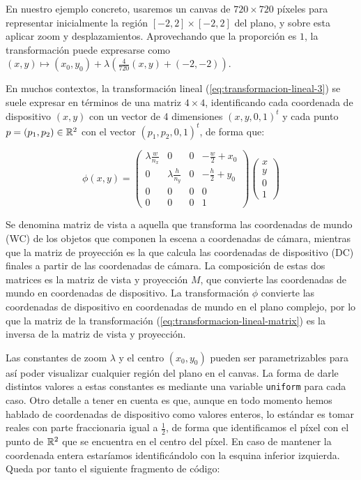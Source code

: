 En nuestro ejemplo concreto, usaremos un canvas de $720\times 720$ píxeles para representar inicialmente la región $[-2,2]\times[-2,2]$ del plano, y sobre esta aplicar zoom y desplazamientos. Aprovechando que la proporción es $1$, la transformación puede expresarse como $(x,y)\longmapsto(x_0,y_0)+\lambda\left(\frac{4}{720}(x,y) + (-2,-2)\right)$.

En muchos contextos, la transformación lineal (\ref{eq:transformacion-lineal-3}) se suele expresar en términos de una matriz $4\times 4$, identificando cada coordenada de dispositivo $(x,y)$ con un vector de 4 dimensiones $(x,y,0,1)^t$ y cada punto $p=(p_1,p_2)\in\mathbb{R}^2$ con el vector $(p_1, p_2, 0 ,1)^t$, de forma que:

\begin{equation}
    \label{eq:transformacion-lineal-matrix}
    \phi(x,y)=\left(\begin{array}{ccc|c}
        \lambda\frac{w}{n_x} & 0 & 0 & -\frac{w}{2}+x_0 \\

        0 & \lambda\frac{h}{n_y} & 0 & -\frac{h}{2}+y_0 \\
        0 & 0 & 0 & 0 \\ \hline
        0 & 0 & 0 & 1
    \end{array}\right)\left(
    \begin{array}{c}
        x \\ y \\ 0 \\ \hline 1
    \end{array}\right)
\end{equation}

Se denomina matriz de vista a aquella que transforma las coordenadas de mundo (WC) de los objetos que componen la escena a coordenadas de cámara, mientras que la matriz de proyección es la que calcula las coordenadas de dispositivo (DC) finales a partir de las coordenadas de cámara. La composición de estas dos matrices es la matriz de vista y proyección $M$, que convierte las coordenadas de mundo en coordenadas de dispositivo. La transformación $\phi$ convierte las coordenadas de dispositivo en coordenadas de mundo en el plano complejo, por lo que la matriz de la transformación (\ref{eq:transformacion-lineal-matrix}) es la inversa de la matriz de vista y proyección.


Las constantes de zoom $\lambda$ y el centro $(x_0,y_0)$ pueden ser parametrizables para así poder visualizar cualquier región del plano en el canvas. La forma de darle distintos valores a estas constantes es mediante una variable \verb|uniform| para cada caso. Otro detalle a tener en cuenta es que, aunque en todo momento hemos hablado de coordenadas de dispositivo como valores enteros, lo estándar es tomar reales con parte fraccionaria igual a $\frac{1}{2}$, de forma que identificamos el píxel con el punto de $\mathbb{R}^2$ que se encuentra en el centro del píxel. En caso de mantener la coordenada entera estaríamos identificándolo con la esquina inferior izquierda. Queda por tanto el siguiente fragmento de código:

